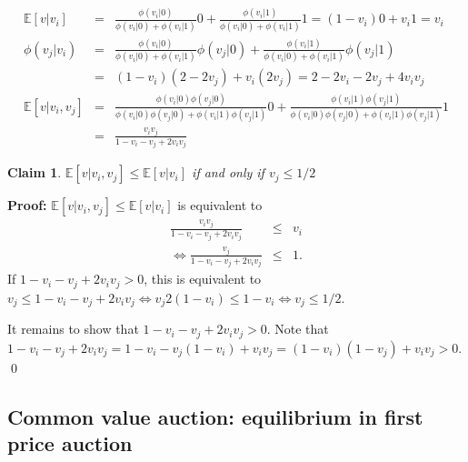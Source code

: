 \documentclass[a4paper,11pt]{article}
\newtheorem{claim}{Claim}
\begin{document}
\begin{eqnarray*}
\mathbb{E}[v|v_i]&=&\frac{\phi(v_i|0)}{\phi(v_i|0)+\phi(v_i|1)}0+\frac{\phi(v_i|1)}{\phi(v_i|0)+\phi(v_i|1)}1=(1-v_i)0+v_i1=v_i\\
 \phi(v_j|v_i)&=&\frac{\phi(v_i|0)}{\phi(v_i|0)+\phi(v_i|1)}\phi(v_j|0)+\frac{\phi(v_i|1)}{\phi(v_i|0)+\phi(v_i|1)}\phi(v_j|1)\\ &=&(1-v_i)(2-2v_j)+v_i(2v_j) =2-2v_i-2v_j+4v_iv_j\\
\mathbb{E}[v|v_i,v_j]&=&\frac{\phi(v_i|0)\phi(v_j|0)}{\phi(v_i|0)\phi(v_j|0)+\phi(v_i|1)\phi(v_j|1)}0+\frac{\phi(v_i|1)\phi(v_j|1)}{\phi(v_i|0)\phi(v_j|0)+\phi(v_i|1)\phi(v_j|1)}1\\ &=&\frac{v_iv_j}{1-v_i-v_j+2v_iv_j}
\end{eqnarray*}

\begin{claim}
  $\mathbb{E}[v|v_i,v_j]\leq\mathbb{E}[v|v_i]$ if and only if $v_j\leq 1/2$ 
\end{claim}
\textbf{Proof: }$\mathbb{E}[v|v_i,v_j]\leq\mathbb{E}[v|v_i]$ is equivalent to
\begin{eqnarray*}
  \frac{v_iv_j}{1-v_i-v_j+2v_iv_j}&\leq& v_i\\
  \Leftrightarrow \frac{v_j}{1-v_i-v_j+2v_iv_j}&\leq& 1.
\end{eqnarray*}
If $1-v_i-v_j+2v_iv_j>0$, this is equivalent to $v_j\leq1-v_i-v_j+2v_iv_j\Leftrightarrow v_j2 (1-v_i)\leq 1-v_i\Leftrightarrow v_j\leq 1/2$.

It remains to show that $1-v_i-v_j+2v_iv_j>0$. Note that $1-v_i-v_j+2v_iv_j=1-v_i-v_j(1-v_i)+v_iv_j=(1-v_i)(1-v_j)+v_iv_j>0$.
\qed

\subsection{Common value auction: equilibrium in first price auction}
\label{sec:comm-value-auct-1}
\end{document}
